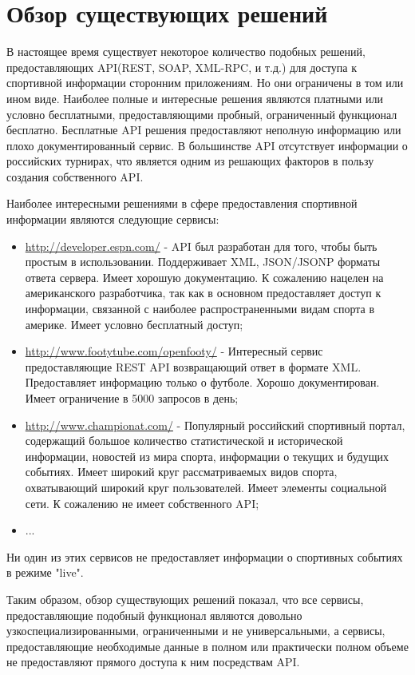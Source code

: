 \section{Обзор существующих решений}
В настоящее время существует некоторое количество подобных решений, предоставляющих API(REST, SOAP, XML-RPC, и т.д.) для доступа к спортивной информации сторонним приложениям.
Но они ограничены в том или ином виде. Наиболее полные и интересные решения являются платными или условно бесплатными, предоставляющими пробный, ограниченный функционал бесплатно. Бесплатные API решения предоставляют неполную информацию или плохо документированный сервис. В большинстве API отсутствует информации о российских турнирах, что является одним из решающих факторов в пользу создания собственного API.

Наиболее интересными решениями в сфере предоставления спортивной информации являются следующие сервисы:

\begin{itemize}
\item \url{http://developer.espn.com/} - API был разработан для того, чтобы быть простым в использовании. Поддерживает XML, JSON/JSONP форматы ответа сервера. Имеет хорошую документацию. К сожалению нацелен на американского разработчика, так как в основном предоставляет доступ к информации, связанной с наиболее распространенными видам спорта в америке. Имеет условно бесплатный доступ;
\item \url{http://www.footytube.com/openfooty/} - Интересный сервис предоставляющие REST API возвращающий ответ в формате XML. Предоставляет информацию только о футболе. Хорошо документирован. Имеет ограничение в 5000 запросов в день;
\item \url{http://www.championat.com/} - Популярный российский спортивный портал, содержащий большое количество статистической и исторической информации, новостей из мира спорта, информации о текущих и будущих событиях. Имеет широкий круг рассматриваемых видов спорта, охватывающий широкий круг пользователей. Имеет элементы социальной сети. К сожалению не имеет собственного API;
\item ...
\end{itemize}

Ни один из этих сервисов не предоставляет информации о спортивных событиях в режиме "live".

Таким образом, обзор существующих решений показал, что все сервисы, предоставляющие подобный функционал являются довольно узкоспециализированными, ограниченными и не универсальными, а сервисы, предоставляющие необходимые данные в полном или практически полном объеме не предоставляют прямого доступа к ним посредствам API. 

